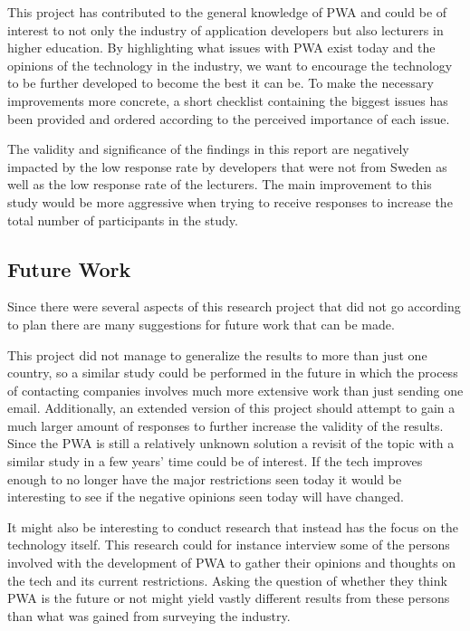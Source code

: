 \documentclass[a4paper,12pt]{article}
\begin{document}
This project has contributed to the general knowledge of PWA and could be of interest to not only the industry of application developers but also lecturers in higher education. By highlighting what issues with PWA exist today and the opinions of the technology in the industry, we want to encourage the technology to be further developed to become the best it can be. To make the necessary improvements more concrete, a short checklist containing the biggest issues has been provided and ordered according to the perceived importance of each issue.

The validity and significance of the findings in this report are negatively impacted by the low response rate by developers that were not from Sweden as well as the low response rate of the lecturers. The main improvement to this study would be more aggressive when trying to receive responses to increase the total number of participants in the study.

\subsection{Future Work}
\label{Conclusions_futureWork}
Since there were several aspects of this research project that did not go according to plan there are many suggestions for future work that can be made.

This project did not manage to generalize the results to more than just one country, so a similar study could be performed in the future in which the process of contacting companies involves much more extensive work than just sending one email. Additionally, an extended version of this project should attempt to gain a much larger amount of responses to further increase the validity of the results. Since the PWA is still a relatively unknown solution a revisit of the topic with a similar study in a few years' time could be of interest. If the tech improves enough to no longer have the major restrictions seen today it would be interesting to see if the negative opinions seen today will have changed.

It might also be interesting to conduct research that instead has the focus on the technology itself. This research could for instance interview some of the persons involved with the development of PWA to gather their opinions and thoughts on the tech and its current restrictions. Asking the question of whether they think PWA is the future or not might yield vastly different results from these persons than what was gained from surveying the industry.
\end{document}
